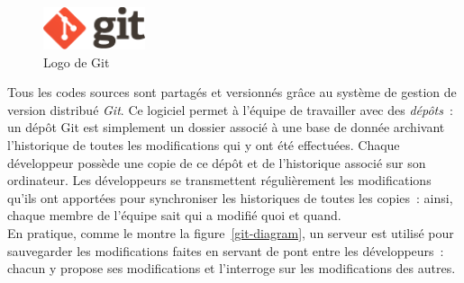 \paragraph{}
\begin{figure}
  \centering
  \includegraphics[width=3cm]{images/git-logo.png}
  \caption{Logo de Git}
\end{figure}
Tous les codes sources sont partagés et versionnés grâce au système de gestion de version 
distribué \emph{Git}\cite{gestion-versions}. Ce logiciel permet à l'équipe de travailler
avec des \emph{dépôts}~: un dépôt Git est simplement un dossier associé à une base
de donnée archivant l'historique de toutes les modifications qui y ont été effectuées. Chaque développeur
possède une copie de ce dépôt et de l'historique associé sur son ordinateur. Les développeurs se
transmettent régulièrement les modifications qu'ils ont apportées pour synchroniser
les historiques de toutes les copies~: ainsi, chaque membre de l'équipe sait qui a modifié quoi et quand.\\
En pratique, comme le montre la figure~\ref{git-diagram}, un serveur est utilisé pour sauvegarder les modifications faites en
servant de pont entre les développeurs~: chacun y propose ses modifications et l'interroge
sur les modifications des autres.
